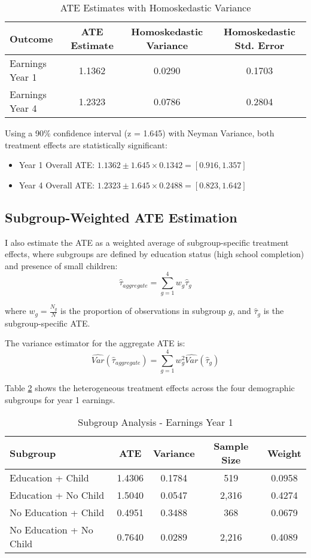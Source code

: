 \documentclass[12pt]{article}
\begin{document}
\begin{table}[h]
\centering
\caption{ATE Estimates with Homoskedastic Variance}
\label{tab:main_results_homo}
\begin{tabular}{lccc}
\hline
\textbf{Outcome} & \textbf{ATE Estimate} & \textbf{Homoskedastic Variance} & \textbf{Homoskedastic Std. Error} \\
\hline
Earnings Year 1 & 1.1362 & 0.0290 & 0.1703 \\
Earnings Year 4 & 1.2323 & 0.0786 & 0.2804 \\
\hline
\end{tabular}
\end{table}


Using a 90\% confidence interval (z = 1.645) with Neyman Variance, both treatment effects are statistically significant:
\begin{itemize}
    \item Year 1 Overall ATE: $1.1362 \pm 1.645 \times 0.1342 = [0.916, 1.357]$
    \item Year 4 Overall ATE: $1.2323 \pm 1.645 \times 0.2488 = [0.823, 1.642]$
\end{itemize}





\subsection{Subgroup-Weighted ATE Estimation}
I also estimate the ATE as a weighted average of subgroup-specific treatment effects, where subgroups are defined by education status (high school completion) and presence of small children:
$$\hat{\tau}_{aggregate} = \sum_{g=1}^{4} w_g \hat{\tau}_g$$

where $w_g = \frac{N_g}{N}$ is the proportion of observations in subgroup $g$, and $\hat{\tau}_g$ is the subgroup-specific ATE.

The variance estimator for the aggregate ATE is:
$$\widehat{Var}(\hat{\tau}_{aggregate}) = \sum_{g=1}^{4} w_g^2 \widehat{Var}(\hat{\tau}_g)$$

Table \ref{tab:subgroup_results} shows the heterogeneous treatment effects across the four demographic subgroups for year 1 earnings.

\begin{table}[h]
\centering
\caption{Subgroup Analysis - Earnings Year 1}
\label{tab:subgroup_results}
\begin{tabular}{lcccc}
\hline
\textbf{Subgroup} & \textbf{ATE} & \textbf{Variance} & \textbf{Sample Size} & \textbf{Weight} \\
\hline
Education + Child & 1.4306 & 0.1784 & 519 & 0.0958 \\
Education + No Child & 1.5040 & 0.0547 & 2,316 & 0.4274 \\
No Education + Child & 0.4951 & 0.3488 & 368 & 0.0679 \\
No Education + No Child & 0.7640 & 0.0289 & 2,216 & 0.4089 \\
\hline
\end{tabular}
\end{table}
\end{document}
